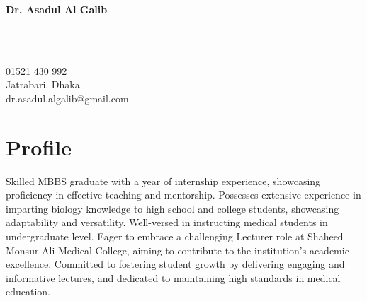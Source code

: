 \documentclass[a4paper,11pt]{article}
\begin{document}
\begin{minipage}[t][3cm]{1.2\textwidth}
    \raggedright
  \begin{minipage}[h][2.6cm][h]{0.4\textwidth}
    {\Huge\bfseries\color{black}Dr. Asadul Al Galib}
  \end{minipage}
  \begin{minipage}[h][2.6cm][h]{0.03\textwidth}
      \faPhone\\
      \faMapMarker\\
      \faEnvelopeO
  \end{minipage}
  \begin{minipage}[h][2.6cm][h]{0.28\textwidth}
      01521 430 992\\
      Jatrabari, Dhaka\\
      dr.asadul.algalib@gmail.com
  \end{minipage}
\end{minipage} 
\begin{minipage}[t][5.6cm]{0.98\textwidth}
  \section*{Profile}
  Skilled MBBS graduate with a year of internship experience, showcasing proficiency in effective teaching and mentorship. 
  Possesses extensive experience in imparting biology knowledge to high school and college students, showcasing adaptability and versatility. 
  Well-versed in instructing medical students in undergraduate level. 
  Eager to embrace a challenging Lecturer role at Shaheed Monsur Ali Medical College, aiming to contribute to the institution's academic excellence. 
  Committed to fostering student growth by delivering engaging and informative lectures, and dedicated to maintaining high standards in medical education.
\end{minipage}
\end{document}
